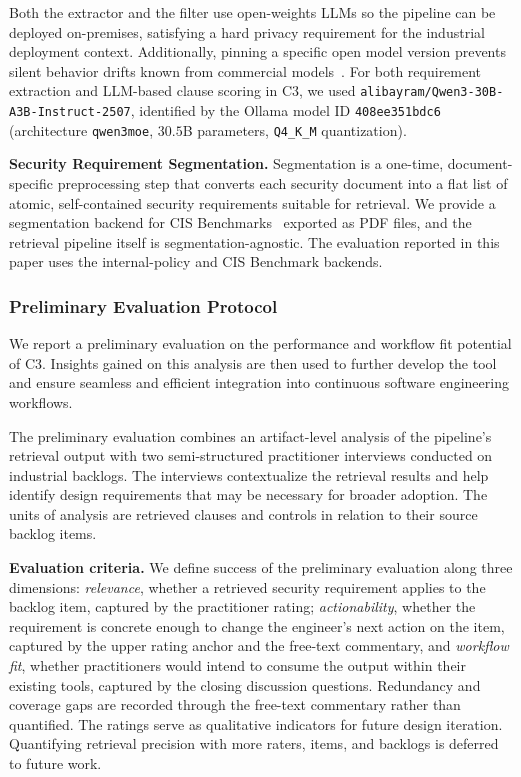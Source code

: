 Both the extractor and the filter use open-weights LLMs so the pipeline can be deployed on-premises, satisfying a hard privacy requirement for the industrial deployment context.
Additionally, pinning a specific open model version prevents silent behavior drifts known from commercial models~\cite{baltes2026guidelinesempiricalstudiessoftware, angermeirReproducibility}.
For both requirement extraction and LLM-based clause scoring in C3, we used \texttt{alibayram/Qwen3-30B-A3B-Instruct-2507}, identified by the Ollama model ID \texttt{408ee351bdc6} (architecture \texttt{qwen3moe}, $30.5$B parameters, \texttt{Q4\_K\_M} quantization).

\textbf{Security Requirement Segmentation.}
Segmentation is a one-time, document-specific preprocessing step that converts each security document into a flat list of atomic, self-contained security requirements suitable for retrieval.
We provide a segmentation backend for CIS Benchmarks~\cite{cis2024benchmarks} exported as PDF files, and the retrieval pipeline itself is segmentation-agnostic.
The evaluation reported in this paper uses the internal-policy and CIS Benchmark backends.

\subsubsection*{Preliminary Evaluation Protocol}\label{sec:methodology-c3-eval}

We report a preliminary evaluation on the performance and workflow fit potential of C3.
Insights gained on this analysis are then used to further develop the tool and ensure seamless and efficient integration into continuous software engineering workflows.

The preliminary evaluation combines an artifact-level analysis of the pipeline's retrieval output with two semi-structured practitioner interviews conducted on industrial backlogs.
The interviews contextualize the retrieval results and help identify design requirements that may be necessary for broader adoption.
The units of analysis are retrieved clauses and controls in relation to their source backlog items.

\textbf{Evaluation criteria.}
We define success of the preliminary evaluation along three dimensions: \emph{relevance}, whether a retrieved security requirement applies to the backlog item, captured by the practitioner rating; \emph{actionability}, whether the requirement is concrete enough to change the engineer's next action on the item, captured by the upper rating anchor and the free-text commentary, and \emph{workflow fit}, whether practitioners would intend to consume the output within their existing tools, captured by the closing discussion questions.
Redundancy and coverage gaps are recorded through the free-text commentary rather than quantified.
The ratings serve as qualitative indicators for future design iteration.
Quantifying retrieval precision with more raters, items, and backlogs is deferred to future work.

